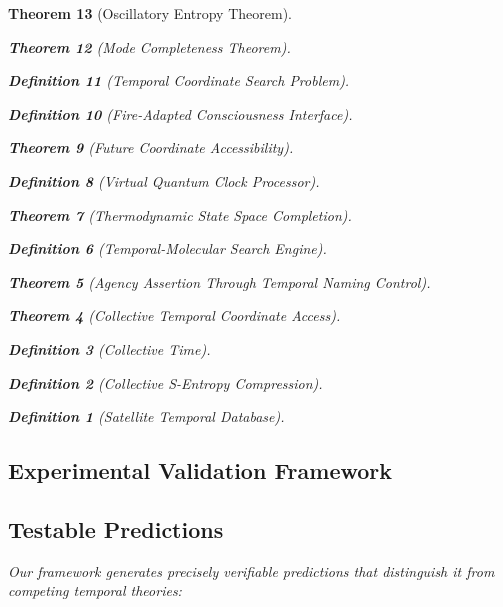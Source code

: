 \documentclass[12pt,a4paper]{article}
\newtheorem{theorem}{Theorem}[section]
\newtheorem{definition}[theorem]{Definition}
\begin{document}
\begin{theorem}[Oscillatory Entropy Theorem]
\begin{theorem}[Mode Completeness Theorem]
\begin{enumerate}
\begin{definition}[Temporal Coordinate Search Problem]
\begin{algorithm}
\begin{definition}[Fire-Adapted Consciousness Interface]
\begin{theorem}[Future Coordinate Accessibility]
\begin{definition}[Virtual Quantum Clock Processor]
\begin{itemize}
\begin{itemize}
\begin{theorem}[Thermodynamic State Space Completion]
\begin{definition}[Temporal-Molecular Search Engine]
\begin{theorem}[Agency Assertion Through Temporal Naming Control]
\begin{remark}
\begin{theorem}[Collective Temporal Coordinate Access]
\begin{definition}[Collective Time]
\begin{definition}[Collective S-Entropy Compression]
\begin{definition}[Satellite Temporal Database]
\begin{algorithm}
\begin{table}[h]
{{\section{Experimental Validation Framework}

\subsection{Testable Predictions}

Our framework generates precisely verifiable predictions that distinguish it from competing temporal theories:

\begin{figure}[h]
\centering
{}
\end{figure}}}
\end{table}
\end{algorithm}
\end{definition}
\end{definition}
\end{definition}
\end{theorem}
\end{remark}
\end{theorem}
\end{definition}
\end{theorem}
\end{itemize}
\end{itemize}
\end{definition}
\end{theorem}
\end{definition}
\end{algorithm}
\end{definition}
\end{enumerate}
\end{theorem}
\end{theorem}
\end{document}
